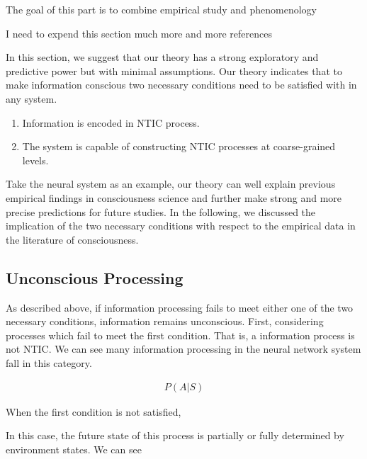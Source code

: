 \documentclass[utf8]{article}
\newcommand{\ideaBox}[1]{
			    \vspace{2mm}
				\begin{tcolorbox}[enhanced,%
                    title=-,
                    center,
                    fontupper=\small,
                    lifted shadow={1mm}{-2mm}{3mm}{0.1mm}{black!50!white},%
                    boxrule=0.4pt,
                    width=9cm,
                    colback=Thistle!50!white,
                    sharp corners]
					#1
				\end{tcolorbox}
				\vspace{2mm}
			}
\newcommand{\rlstart}[1]{  %
        \setlength\changebarwidth{#1pt*2}  %
        \hspace*{-40pt}
        \cbstart{\textcolor{red}{\newline\textbf{iteration #1}}\newline}}
\begin{document}
\rlstart{3}	
		\ideaBox{The goal of this part is to combine empirical study and phenomenology}
	    \ideaBox{I need to expend this section much more and more references}
	    In this section, we suggest that our theory has a strong exploratory and predictive power but with minimal assumptions.  
		Our theory indicates that to make information conscious two necessary conditions need to be satisfied with in any system. 
		
		\begin{enumerate}
		    \item Information is encoded in NTIC process. 
		    \item The system is capable of constructing NTIC processes at coarse-grained levels. 
		\end{enumerate}		
		
		Take the neural system as an example, our theory can well explain previous empirical findings in consciousness science and further make strong and more precise predictions for future studies. In the following, we discussed the implication of the two necessary conditions with respect to the empirical data in the literature of consciousness. 
		
		\subsection{Unconscious Processing}
		As described above, if information processing fails to meet either one of the two necessary conditions, information remains unconscious. First, considering processes which fail to meet the first condition. That is, a information process is not NTIC. We can see many information processing in the neural network system fall in this category. 
		
		
		
		\begin{equation}\label{eq:InformationFlow}
		\begin{aligned}
            P(A|S)
        \end{aligned}
		\end{equation}
		
		When the first condition is not satisfied,  
		
		
		
		In this case, the future state of this process is partially or fully determined by environment states. We can see 
		
\end{document}
